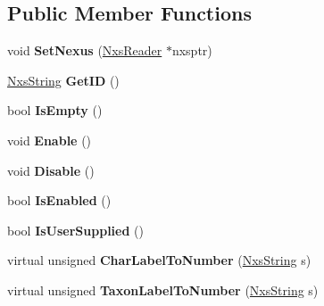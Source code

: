 \subsection*{Public Member Functions}
\begin{DoxyCompactItemize}
\item 
\hypertarget{classNxsBlock_ade0e632784669a14df73fa0dc927d6b2}{
void {\bfseries SetNexus} (\hyperlink{classNxsReader}{NxsReader} $\ast$nxsptr)}
\label{classNxsBlock_ade0e632784669a14df73fa0dc927d6b2}

\item 
\hypertarget{classNxsBlock_a69f8ef50e0b6ab9a967b02f35d226e4e}{
\hyperlink{classNxsString}{NxsString} {\bfseries GetID} ()}
\label{classNxsBlock_a69f8ef50e0b6ab9a967b02f35d226e4e}

\item 
\hypertarget{classNxsBlock_adb227d7b480839feaf8f352993c746b4}{
bool {\bfseries IsEmpty} ()}
\label{classNxsBlock_adb227d7b480839feaf8f352993c746b4}

\item 
\hypertarget{classNxsBlock_ae3236495862428eb16ffe8fa841fd76a}{
void {\bfseries Enable} ()}
\label{classNxsBlock_ae3236495862428eb16ffe8fa841fd76a}

\item 
\hypertarget{classNxsBlock_a08fd00d328cba58ead5a98f8edd39f14}{
void {\bfseries Disable} ()}
\label{classNxsBlock_a08fd00d328cba58ead5a98f8edd39f14}

\item 
\hypertarget{classNxsBlock_aad4bd8800e59e1504036525c945aea55}{
bool {\bfseries IsEnabled} ()}
\label{classNxsBlock_aad4bd8800e59e1504036525c945aea55}

\item 
\hypertarget{classNxsBlock_a8e41dfbbba26e86d841ca917ea0cdfcd}{
bool {\bfseries IsUserSupplied} ()}
\label{classNxsBlock_a8e41dfbbba26e86d841ca917ea0cdfcd}

\item 
\hypertarget{classNxsBlock_ae7eb26a193ae8f65017427e83a69de0e}{
virtual unsigned {\bfseries CharLabelToNumber} (\hyperlink{classNxsString}{NxsString} s)}
\label{classNxsBlock_ae7eb26a193ae8f65017427e83a69de0e}

\item 
\hypertarget{classNxsBlock_a22fe174afbb5f5a97c3eb386ea43c8c8}{
virtual unsigned {\bfseries TaxonLabelToNumber} (\hyperlink{classNxsString}{NxsString} s)}
\label{classNxsBlock_a22fe174afbb5f5a97c3eb386ea43c8c8}


\end{DoxyCompactItemize}
